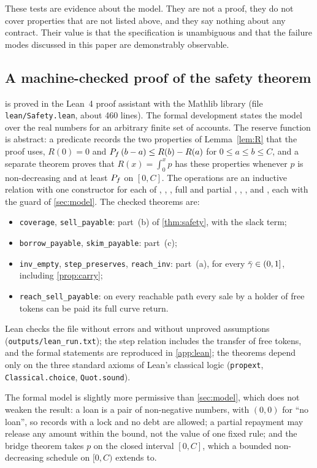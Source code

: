 These tests are evidence about the model. They are not a proof, they do not cover properties that are not listed above, and they say nothing about any contract. Their value is that the specification is unambiguous and that the failure modes discussed in this paper are demonstrably observable.

\subsection{A machine-checked proof of the safety theorem}\label{sec:lean}

 is proved in the Lean~4 proof assistant with the Mathlib library \citep{lean4,mathlib} (file \texttt{lean/Safety.lean}, about 460 lines). The formal development states the model over the real numbers for an arbitrary finite set of accounts. The reserve function is abstract: a predicate records the two properties of Lemma~\ref{lem:R} that the proof uses, $R(0)=0$ and $P_f\,(b-a)\le R(b)-R(a)$ for $0\le a\le b\le C$, and a separate theorem proves that $R(x)=\int_0^x p$ has these properties whenever $p$ is non-decreasing and at least $P_f$ on $[0,C]$. The operations are an inductive relation with one constructor for each of , , , full and partial , , ,  and , each with the guard of \cref{sec:model}. The checked theorems are:
\begin{itemize}
\item \texttt{coverage}, \texttt{sell\_payable}: part~(b) of \cref{thm:safety}, with the slack term;
\item \texttt{borrow\_payable}, \texttt{skim\_payable}: part~(c);
\item \texttt{inv\_empty}, \texttt{step\_preserves}, \texttt{reach\_inv}: part~(a), for every $\bar\gamma\in(0,1]$, including \cref{prop:carry};
\item \texttt{reach\_sell\_payable}: on every reachable path every sale by a holder of free tokens can be paid its full curve return.
\end{itemize}
Lean checks the file without errors and without unproved assumptions (\texttt{outputs/lean\_run.txt}); the step relation includes the transfer of free tokens, and the formal statements are reproduced in \cref{app:lean}; the theorems depend only on the three standard axioms of Lean's classical logic (\texttt{propext}, \texttt{Classical.choice}, \texttt{Quot.sound}).

The formal model is slightly more permissive than \cref{sec:model}, which does not weaken the result: a loan is a pair of non-negative numbers, with $(0,0)$ for ``no loan'', so records with a lock and no debt are allowed; a partial repayment may release any amount within the bound, not the value of one fixed rule; and the bridge theorem takes $p$ on the closed interval $[0,C]$, which a bounded non-decreasing schedule on $[0,C)$ extends to.

